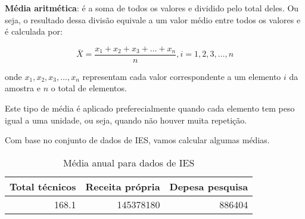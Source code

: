 \documentclass[11pt,]{style/krantz}
\makeatletter
\newenvironment{Shaded}{\begin{snugshade}}{\end{snugshade}}
\newcommand{\DataTypeTok}[1]{\textcolor[rgb]{0.13,0.29,0.53}{#1}}
\newcommand{\KeywordTok}[1]{\textcolor[rgb]{0.13,0.29,0.53}{\textbf{#1}}}
\newcommand{\NormalTok}[1]{#1}
\newcommand{\OperatorTok}[1]{\textcolor[rgb]{0.81,0.36,0.00}{\textbf{#1}}}
\newcommand{\StringTok}[1]{\textcolor[rgb]{0.31,0.60,0.02}{#1}}
\renewenvironment{quote}{\begin{VF}}{\end{VF}}
\newenvironment{kframe}{%
\medskip{}
\setlength{\fboxsep}{.8em}
 \def\at@end@of@kframe{}%
 \ifinner\ifhmode%
  \def\at@end@of@kframe{\end{minipage}}%
  \begin{minipage}{\columnwidth}%
 \fi\fi%
 \def\FrameCommand##1{\hskip\@totalleftmargin \hskip-\fboxsep
 \colorbox{shadecolor}{##1}\hskip-\fboxsep
     \hskip-\linewidth \hskip-\@totalleftmargin \hskip\columnwidth}%
 \MakeFramed {\advance\hsize-\width
   \@totalleftmargin\z@ \linewidth\hsize
   \@setminipage}}%
 {\par\unskip\endMakeFramed%
 \at@end@of@kframe}
\renewenvironment{Shaded}{\begin{kframe}}{\end{kframe}}
\theoremstyle{definition}
\theoremstyle{definition}
\theoremstyle{definition}
\theoremstyle{remark}
\let\BeginKnitrBlock\begin \let\EndKnitrBlock\end
\makeatother
\begin{document}
\textbf{Média aritmética}: é a soma de todos os valores e dividido pelo total deles. Ou seja, o resultado dessa divisão equivale a um valor médio entre todos os valores e é calculada por:

\[\bar X = \frac{x_1 + x_2 + x_3 + \dots + x_n}{n}, i = 1, 2, 3, \dots, n\]

onde \(x_1, x_2, x_3, \dots, x_n\) representam cada valor correspondente a um elemento \(i\) da amostra e \(n\) o total de elementos.

\begin{quote}
Este tipo de média é aplicado preferecialmente quando cada elemento tem peso igual a uma unidade, ou seja, quando não houver muita repetição.
\end{quote}

\BeginKnitrBlock{example}
\protect\hypertarget{exm:unnamed-chunk-48}{}{\label{exm:unnamed-chunk-48} }Com base no conjunto de dados de IES, vamos calcular algumas médias.
\EndKnitrBlock{example}

\begin{Shaded}
\end{Shaded}

\begin{table}[!h]

\caption{\label{tab:tab06}Média anual para dados de IES}
\centering
\begin{tabular}{r|r|r}
\hline
Total técnicos & Receita própria & Depesa pesquisa\\
\hline
168.1 & 145378180 & 886404\\
\hline
\end{tabular}
\end{table}
\end{document}
